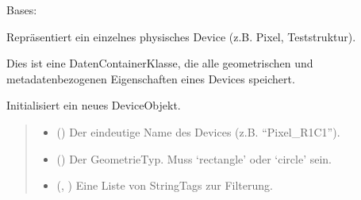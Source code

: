 \documentclass[letterpaper,10pt,english]{sphinxmanual}
\begin{document}
\begin{fulllineitems}
\label{\detokenize{modulab/device_manager:modules.device.DeviceManager.Device}}
\pysigstartsignatures
\pysiglinewithargsret
{}
{\sphinxparamcomma {}\sphinxparamcomma {}\sphinxparamcomma {}}
{}
\pysigstopsignatures
\sphinxAtStartPar
Bases: 

\sphinxAtStartPar
Repräsentiert ein einzelnes physisches Device (z.B. Pixel, Teststruktur).

\sphinxAtStartPar
Dies ist eine Daten\sphinxhyphen{}Container\sphinxhyphen{}Klasse, die alle geometrischen und
metadatenbezogenen Eigenschaften eines Devices speichert.

\begin{fulllineitems}
\label{\detokenize{modulab/device_manager:modules.device.DeviceManager.Device.__init__}}
\pysigstartsignatures
\pysiglinewithargsret
{}
{\sphinxparamcomma {}\sphinxparamcomma {}\sphinxparamcomma {}}
{}
\pysigstopsignatures
\sphinxAtStartPar
Initialisiert ein neues Device\sphinxhyphen{}Objekt.
\begin{quote}\begin{description}
\begin{itemize}
\item {} 
\sphinxAtStartPar
{} () \textendash{} Der eindeutige Name des Devices (z.B. “Pixel\_R1C1”).

\item {} 
\sphinxAtStartPar
{} () \textendash{} Der Geometrie\sphinxhyphen{}Typ. Muss ‘rectangle’ oder ‘circle’ sein.

\item {} 
\sphinxAtStartPar
{} (, ) \textendash{} Eine Liste von String\sphinxhyphen{}Tags zur Filterung.


\end{itemize}
\end{description}
\end{quote}
\end{fulllineitems}
\end{fulllineitems}
\end{document}
